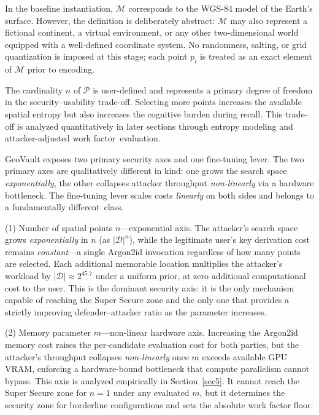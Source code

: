 \documentclass[mathematics,article,accept,pdftex,moreauthors]{Definitions/mdpi}
\begin{document}
In the baseline instantiation, $\mathcal{M}$ corresponds to the WGS-84 model of the Earth’s surface. However, the definition is deliberately abstract: $\mathcal{M}$ may also represent a fictional continent, a virtual environment, or any other two-dimensional world equipped with a well-defined coordinate system. No randomness, salting, or grid quantization is imposed at this stage; each point $p_i$ is treated as an exact element of $\mathcal{M}$ prior to encoding.

The cardinality $n$ of $\mathcal{P}$ is user-defined and represents a primary degree of freedom in the security--usability trade-off. Selecting more points increases the available spatial entropy but also increases the cognitive burden during recall. This trade-off is analyzed quantitatively in later sections through entropy modeling and attacker-adjusted work \mbox{factor evaluation.}

{GeoVault exposes two primary security axes and one fine-tuning lever. The two primary axes are qualitatively different in kind: one grows the search space \emph{exponentially}, the other collapses attacker throughput \emph{non-linearly} via a hardware bottleneck. The fine-tuning lever scales costs \emph{linearly} on both sides and belongs to a fundamentally different~class.}

{(1) Number of spatial points $n$---exponential axis. The attacker's search space grows \emph{exponentially} in $n$ (as $|\mathcal{D}|^n$), while the legitimate user's key derivation cost remains \emph{constant}---a single Argon2id invocation regardless of how many points are selected. Each additional memorable location multiplies the attacker's workload by $|\mathcal{D}| \approx 2^{45.7}$ under a uniform prior, at zero additional computational cost to the user. This is the dominant security axis: it is the only mechanism capable of reaching the Super Secure zone and the only one that provides a strictly improving defender--attacker ratio as the parameter increases.}

{(2) Memory parameter $m$---non-linear hardware axis. Increasing the Argon2id memory cost raises the per-candidate evaluation cost for both parties, but the attacker's throughput collapses \emph{non-linearly} once $m$ exceeds available GPU VRAM, enforcing a hardware-bound bottleneck that compute parallelism cannot bypass. This axis is analyzed empirically in Section~\ref{sec5}. It cannot reach the Super Secure zone for $n=1$ under any evaluated $m$, but it determines the security zone for borderline configurations and sets the absolute work factor floor.}
\end{document}
